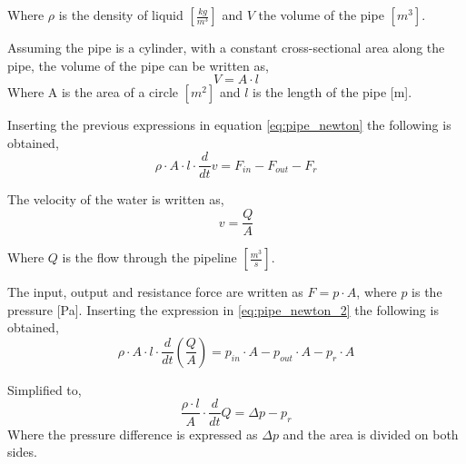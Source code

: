 Where $\rho$ is the density of liquid $\left[\frac{kg}{m^3}\right]$ and $V$ the volume of the pipe $\left[m^3\right]$.



Assuming the pipe is a cylinder, with a constant cross-sectional area along the pipe, the volume of the pipe can be written as, 
\begin{equation}
 V=A \cdot l
\end{equation}
Where A is the area of a circle $[m^2]$ and $l$ is the length of the pipe [m].

Inserting the previous expressions in equation \ref{eq:pipe_newton} the following is obtained,
\begin{equation} \label{eq:pipe_newton_2}
\rho \cdot A \cdot l \cdot \frac{d}{dt}v = F_{in}-F_{out}-F_r 
\end{equation}

The velocity of the water is written as,
\begin{equation}
v=\frac{Q}{A} 
\end{equation}

Where $Q$ is the flow through the pipeline $\left[\frac{m^3}{s}\right]$.

The input, output and resistance force are written as $F=p \cdot A$, where $p$ is the pressure [Pa]. Inserting the expression in \ref{eq:pipe_newton_2} the following is obtained,
\begin{equation}
\rho \cdot A \cdot l \cdot \frac{d}{dt}\left(\frac{Q}{A}\right) = p_{in}\cdot A - p_{out}\cdot A - p_r \cdot A 
\end{equation}

Simplified to,
\begin{equation}\label{eq:pipe_w_pr}
\frac{\rho \cdot l}{A}\cdot \frac{d}{dt}Q = \Delta p - p_r
\end{equation}
Where the pressure difference is expressed as $\Delta p$ and the area is divided on both sides.

